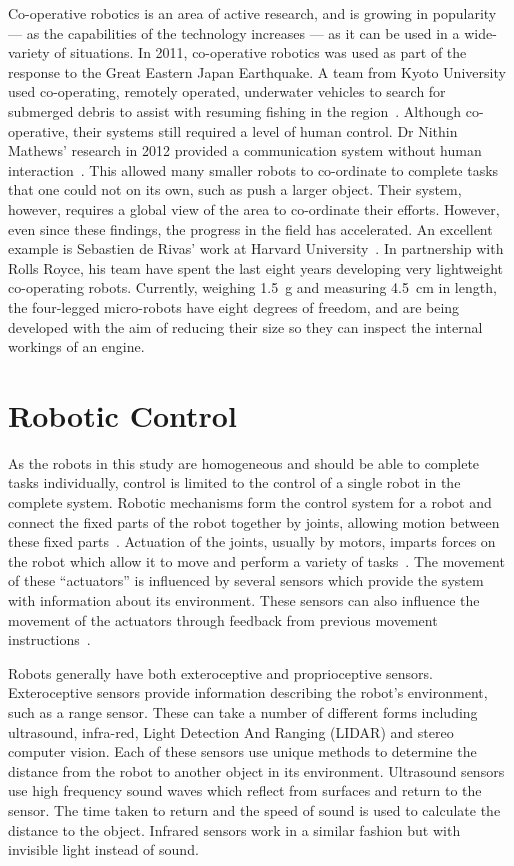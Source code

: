 Co-operative robotics is an area of active research, and is growing in popularity --- as the
capabilities of the technology increases --- as it can be used in a wide-variety of
situations. In 2011, co-operative robotics was used as part of the
response to the Great Eastern Japan Earthquake. A team from Kyoto University
used co-operating, remotely operated, underwater vehicles to search for submerged
debris to assist with resuming fishing in the region~\cite{matsuno2014utilization}.
Although co-operative, their systems still required a level of human control.
Dr Nithin Mathews' research in 2012 provided a communication system without
human interaction~\cite{mathews2012spatially}. This allowed many smaller robots
to co-ordinate to complete tasks that one could not on its own, such as push a
larger object. Their system, however, requires a global view of the area to
co-ordinate their efforts. However, even since these findings, the progress
in the field has accelerated. An excellent example is Sebastien de Rivas' work at
Harvard University~\cite{rollsroyceSWARM}. In partnership with Rolls Royce, his
team have spent the last eight years developing very lightweight co-operating robots.
Currently, weighing \SI{1.5}{\g} and measuring \SI{4.5}{\cm} in length, the
four-legged micro-robots have eight degrees of freedom, and are being developed with
the aim of reducing their size so they can inspect the internal workings of an engine.

\section{Robotic Control} \label{litreview/robotics/control}  
As the robots in this study are homogeneous and should be able to complete 
tasks individually, control is limited to the control of a single robot in the 
complete system. Robotic mechanisms form the control system for a robot and 
connect the fixed parts of the robot together by joints, allowing motion between 
these fixed parts~\cite{lynch2017modern}. Actuation of the joints, usually 
by motors, imparts forces on the robot which allow it to move and perform a 
variety of tasks~\cite{lynch2017modern}. The movement of these ``actuators'' 
is influenced by several sensors which provide the system with information 
about its environment. These sensors can also influence the movement of the 
actuators through feedback from previous movement instructions~\cite{lynch2017modern}.    

Robots generally have both exteroceptive and proprioceptive sensors. Exteroceptive sensors provide information describing the robot's environment, such as a range sensor. These can take a number of different forms 
including ultrasound, infra-red, Light Detection And Ranging (LIDAR) and 
stereo computer vision. Each of these sensors use unique methods to determine 
the distance from the robot to another object in its environment. Ultrasound 
sensors use high frequency sound waves which reflect from surfaces and return 
to the sensor. The time taken to return and the speed of sound is used to 
calculate the distance to the object. Infrared sensors work in a similar 
fashion but with invisible light instead of sound. 

